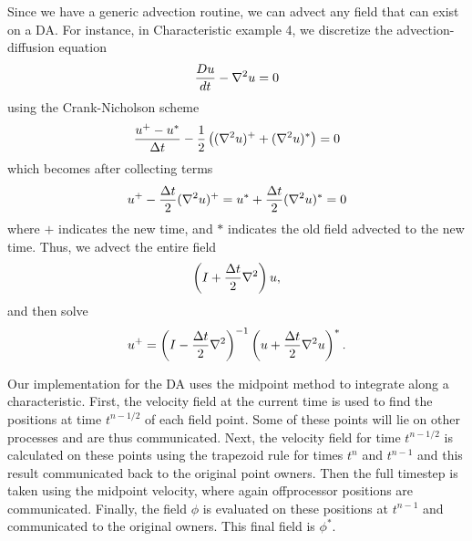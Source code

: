 \documentclass[twoside,12pt]{../sty/report_petsc}
\begin{document}
    Since we have a generic advection routine, we can advect any field that can exist on a DA. For instance, in
Characteristic example 4, we discretize the advection-diffusion equation
\begin{equation}
  {Du\over dt} - \nabla^2 u = 0
\end{equation}
using the Crank-Nicholson scheme
\begin{equation}
  {u^+ - u^* \over \Delta t} - {1\over2} \left( (\nabla^2 u)^+ + (\nabla^2 u)^* \right) = 0
\end{equation}
which becomes after collecting terms
\begin{equation}
  u^+ -  {\Delta t\over 2} (\nabla^2 u)^+ = u^* + {\Delta t\over 2} (\nabla^2 u)^* = 0
\end{equation}
where $+$ indicates the new time, and $*$ indicates the old field advected to the new time. Thus, we advect the entire
field
\begin{equation}
  \left( I + {\Delta t\over 2} \nabla^2 \right) u,
\end{equation}
and then solve
\begin{equation}
  u^+ = \left( I - {\Delta t\over 2} \nabla^2 \right)^{-1} \left( u + {\Delta t\over 2} \nabla^2 u \right)^*.
\end{equation}

Our implementation for the DA uses the midpoint method to integrate along a characteristic. First, the velocity field at
the current time is used to find the positions at time $t^{n-1/2}$ of each field point. Some of these points will lie on
other processes and are thus communicated. Next, the velocity field for time $t^{n-1/2}$ is calculated on these points
using the trapezoid rule for times $t^n$ and $t^{n-1}$ and this result communicated back to the original point
owners. Then the full timestep is taken using the midpoint velocity, where again offprocessor positions are
communicated. Finally, the field $\phi$ is evaluated on these positions at $t^{n-1}$ and communicated to the original
owners. This final field is $\phi^*$.




\end{document}
